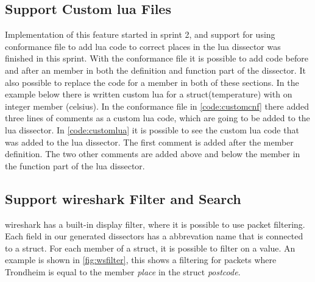 \subsection{Support Custom \Gls{lua} Files}
Implementation of this feature started in sprint 2, and support for using 
conformance file to add \Gls{lua} code to correct places in the \Gls{lua} \gls{dissector} was 
finished in this sprint. With the conformance file it is possible to add code 
before and after an \gls{member} in both the definition and function part of the 
\gls{dissector}. It also possible to replace the code for a \gls{member} in both of these 
sections. In the example below there is written custom \Gls{lua} for a 
\gls{struct}(temperature) with on \gls{integer} \gls{member} (celsius). In the conformance file 
in \autoref{code:customcnf} there added three lines of comments as a custom 
\Gls{lua} code, which are going to be added to the \Gls{lua} \gls{dissector}. In 
\autoref{code:customlua} it is possible to see the custom \Gls{lua} code that was 
added to the \Gls{lua} \gls{dissector}. The first comment is added after the \gls{member} 
definition. The two other comments are added above and below the \gls{member} in the 
function part of the \Gls{lua} \gls{dissector}.





\subsection{Support \Gls{wireshark} Filter and Search}
\Gls{wireshark} has a built-in display filter, where it is possible to use \gls{packet} filtering. 
Each field in our generated \glspl{dissector} has a abbrevation name that is 
connected to a \gls{struct}. For each \gls{member} of a \gls{struct}, it is possible to filter 
on a value. An example is shown in \autoref{fig:wsfilter}, this shows a 
filtering for \glspl{packet} where Trondheim is equal to the \gls{member} \emph{place} in 
the \gls{struct} \emph{postcode}. 

